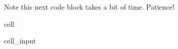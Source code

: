 \documentclass[letterpaper,10pt,english]{jupyterBook}
\begin{document}
\begin{sphinxShadowBox}
\sphinxstylesidebartitle{}

\sphinxAtStartPar
Note this next code block takes a bit of time. Patience!
\end{sphinxShadowBox}

\begin{sphinxuseclass}{cell}\begin{sphinxVerbatimInput}

\begin{sphinxuseclass}{cell_input}
\begin{sphinxVerbatim}[commandchars=\\\{\}]
  
\end{sphinxVerbatim}

\end{sphinxuseclass}\end{sphinxVerbatimInput}
\begin{sphinxVerbatimOutput}


\end{sphinxVerbatimOutput}
\end{sphinxuseclass}
\end{document}
